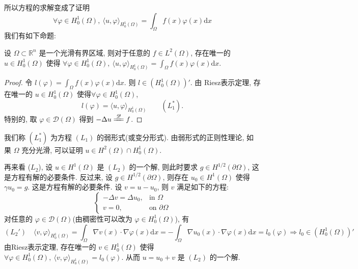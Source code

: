 \documentclass[11pt]{ctexart}[UTF8]
\begin{document}
所以方程的求解变成了证明
\begin{equation*}
    \forall \varphi \in H_{0}^{1}(\Omega),\ \langle u, \varphi \rangle_{H_{0}^{1}(\Omega)} = \int_{\Omega} f(x) \varphi(x) \mathrm{d}x
\end{equation*}
我们有如下命题:
\begin{proposition}
    设 $\Omega \subset \mathbb{R}^n$ 是一个光滑有界区域, 则对于任意的 $f \in L^2(\Omega)$, 存在唯一的 $u \in H_{0}^{1}(\Omega)$ 使得 $\forall \varphi \in H_{0}^{1}(\Omega),\ \langle u, \varphi \rangle_{H_{0}^{1}(\Omega)} = \int_{\Omega} f(x) \varphi(x) \mathrm{d}x$.
\end{proposition}
\begin{proof}
    令 $l(\varphi) = \int_{\Omega} f(x) \varphi(x) \mathrm{d}x$. 则 $l \in (H_{0}^{1}(\Omega))'$.
    由 Riesz表示定理, 存在唯一的 $u \in H_{0}^{1}(\Omega)$ 使得$\forall \varphi \in H_{0}^{1}(\Omega)$,
    $$l(\varphi) = \langle u, \varphi \rangle_{H_{0}^{1}(\Omega)}\quad\quad (L_{1}^*).$$ 
    特别的, 取 $\varphi \in \mathscr{D}(\Omega)$ 得到 $-\Delta u \xlongequal{\mathscr{D}} f$.
\end{proof}
\begin{remark}
    我们称 $(L_1^*)$ 为方程 $(L_1)$ 的弱形式(或变分形式). 由弱形式的正则性理论, 如果 $\Omega$ 充分光滑, 可以证明 $u \in H^2(\Omega) \cap H_0^1(\Omega)$.
\end{remark}
再来看 ($L_2$), 设 $u \in H^{1}(\Omega)$ 是 $(L_2)$ 的一个解, 则此时要求 $g \in H^{1/2}(\partial \Omega)$, 这是方程有解的必要条件. 反过来, 
设 $g \in H^{1/2}(\partial \Omega)$, 则存在 $u_{0} \in H^{1}(\Omega)$ 使得 $\gamma u_0 = g$. 这是方程有解的必要条件.
设 $v = u-u_0$, 则 $v$ 满足如下的方程:
\begin{equation*}
    \begin{cases}
        -\Delta v = \Delta u_0, & \text{in } \Omega\\
        v = 0, & \text{on } \partial \Omega
    \end{cases}
\end{equation*}
对任意的 $\varphi \in \mathscr{D}(\Omega)$(由稠密性可以改为 $\varphi \in H_{0}^{1}(\Omega)$), 有
\begin{equation*}
    (L_2')\quad \langle v, \varphi \rangle_{H_{0}^{1}(\Omega)} = \int_{\Omega} \nabla v(x) \cdot \nabla \varphi(x) \mathrm{d}x = -\int_{\Omega} \nabla u_0(x) \cdot \nabla \varphi(x) \mathrm{d}x=l_{0}(\varphi) \Longrightarrow l_{0} \in (H_{0}^{1}(\Omega))'
\end{equation*}
由Riesz表示定理, 存在唯一的 $v \in H_{0}^{1}(\Omega)$ 使得 $\forall \varphi \in H_{0}^{1}(\Omega),\ \langle v, \varphi \rangle_{H_{0}^{1}(\Omega)} = l_{0}(\varphi)$. 从而 $u = u_0 + v$ 是 $(L_2)$ 的一个解.\par
\end{document}
